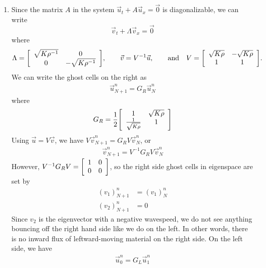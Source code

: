 \documentclass{article} %
\theoremstyle{plain}
\numberwithin{equation}{section} %
\numberwithin{figure}{section} %
\numberwithin{table}{section} %
\begin{document}
\begin{enumerate}[\ \ (a)]
    \item
        Since the matrix $A$ in the system $\vec{u}_t + A\vec{u}_x = \vec{0}$ is diagonalizable, we can write $$\vec{v}_t + \Lambda \vec{v}_x = \vec{0}$$ where
        \begin{align*}
            \Lambda = \qty[\begin{array}{cc}
                \sqrt{K\rho^{-1}} & 0 \\
                0 & -\sqrt{K\rho^{-1}}
            \end{array}], \qquad \vec{v} = V^{-1}\vec{u}, \qquad \text{and }\ \ V = \qty[\begin{array}{cc}
                \sqrt{K\rho} & -\sqrt{K\rho} \\ 1 & 1
            \end{array}].
        \end{align*}
        We can write the ghost cells on the right as
        \begin{align*}
            \vec{u}_{N+1}^n = G_R\vec{u}_N^n
        \end{align*}
        where
        \begin{align*}
            G_R = \frac{1}{2}\qty[\begin{array}{cc}
                1 & \sqrt{K\rho} \\ \frac{1}{\sqrt{K\rho}} & 1
            \end{array}]
        \end{align*}
        Using $\vec{u} = V\vec{v}$, we have $V\vec{v}_{N+1}^n = G_RV\vec{v}_N^n$, or
        \begin{align*}
            \vec{v}_{N+1}^n = V^{-1}G_RV\vec{v}_N^n
        \end{align*}
        However, $V^{-1}G_RV = \qty[\begin{array}{cc}1 & 0 \\ 0 & 0\end{array}]$, so the right side ghost cells in eigenspace are set by
        \begin{align*}
            (v_1)_{N+1}^n &= (v_1)_N^n \\
            (v_2)_{N+1}^n &= 0
        \end{align*}
        Since $v_2$ is the eigenvector with a negative wavespeed, we do not see anything bouncing off the right hand side like we do on the left.  In other words, there is no inward flux of leftward-moving material on the right side.  On the left side, we have
        \begin{align*}
            \vec{u}_{0}^n = G_L\vec{u}_1^n

\end{align*}
\end{enumerate}
\end{document}
